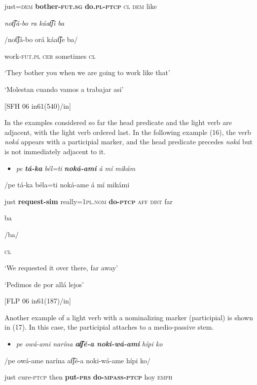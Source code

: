 just=\textsc{dem}  \textbf{bother-\textsc{fut.sg}} \textbf{do\textsc{.pl-ptcp}}    \textsc{cl}  \textsc{dem} like  

  \textit{not͡ʃá-bo  ra   káat͡ʃi    ba}

/not͡ʃá-bo  orá  káat͡ʃe    ba/    

work-\textsc{fut.pl}  \textsc{cer}  sometimes  \textsc{cl}

  ‘They bother you when we are going to work like that’

‘Molestan cuando vamos a trabajar asi’

  [SFH 06 in61(540)/in]

In the examples considered so far the head predicate and the light verb are adjacent, with the light verb ordered last. In the following example (16), the verb \textit{noká} appears with a participial marker, and the head predicate precedes \textit{noká} but is not immediately adjacent to it. 

\begin{itemize}
\item \textit{pe} \textbf{\textit{tá-ka}} \textit{bél=ti} \textbf{\textit{noká-ami}} \textit{á   mí   mikám}
\end{itemize}

/pe  tá-ka    béla=ti      noká-ame  á  mí  mikámi  

just  \textbf{request-sim}  really=1\textsc{pl.nom}  \textbf{do-\textsc{ptcp}}  \textsc{aff}  \textsc{dist}  far  

ba

/ba/

\textsc{cl}  

  ‘We requested it over there, far away’

‘Pedimos de por allá lejos’

  [FLP 06 in61(187)/in]

  Another example of a light verb with a nominalizing marker (participial) is shown in (17). In this case, the participial attaches to a medio-passive stem.

\begin{itemize}
\item \textit{pe   owá-ami   narína} \textbf{\textit{at͡ʃé-a   noki-wá-ami} } \textit{hípi   ko}    
\end{itemize}

/pe  owá-ame  narína    at͡ʃé-a    noki-wá-ame    hípi  ko/

just  cure-\textsc{ptcp}  then    \textbf{put-\textsc{prs}} \textbf{do-\textsc{mpass}}\textbf{{}-}\textbf{\textsc{ptcp}}  hoy  \textsc{emph}  

